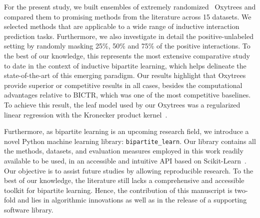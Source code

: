 \documentclass[sn-mathphys-num]{sn-jnl}%
\theoremstyle{thmstyleone}%
\theoremstyle{thmstyletwo}%
\theoremstyle{thmstylethree}%
\begin{document}
For the present study, we built ensembles of extremely randomized~\cite{geurts_extremely_2006} Oxytrees and compared them to promising methods from the literature across 15 datasets. We selected methods that are applicable to a wide range of inductive interaction prediction tasks.
Furthermore, we also investigate in detail the positive-unlabeled setting by randomly masking 25\%, 50\% and 75\% of the positive interactions.
%
To the best of our knowledge, this represents the most extensive comparative study to date in the context of inductive bipartite learning, which helps delineate the state-of-the-art of this emerging paradigm.
%
Our results highlight that Oxytrees provide superior or competitive results in all cases, besides the computational advantages relative to BICTR, which was one of the most competitive baselines. To achieve this result, the leaf model used by our Oxytrees was a regularized linear regression with the Kronecker product kernel~\cite{van_laarhoven_gaussian_2011}.


Furthermore, as bipartite learning is an upcoming research field, we introduce a novel Python machine learning library: \texttt{bipartite\_learn}. Our library contains all the methods, datasets, and evaluation measures employed in this work readily available to be used,
in an accessible and intuitive API based on Scikit-Learn~\cite{pedregosa_scikit-learn_2011}.
Our objective is to assist future studies by allowing reproducible research. To the best of our knowledge, the literature still lacks a comprehensive and accessible toolkit for bipartite learning. Hence, the contribution of this manuscript is two-fold and lies in algorithmic innovations as well as in the release of a supporting software library.




%    
\end{document}

